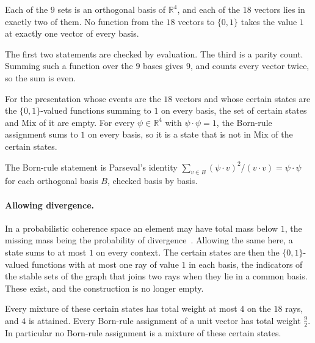 \begin{theorem}
\label{thm:ks}
Each of the $9$ sets is an orthogonal basis of $\mathbb{R}^4$, and each of
the $18$ vectors lies in exactly two of them. No function from the $18$
vectors to $\{0,1\}$ takes the value $1$ at exactly one vector of every
basis.
\end{theorem}

\noindent
The first two statements are checked by evaluation. The third is a
parity count. Summing such a function over the $9$ bases gives $9$, and
counts every vector twice, so the sum is even.

\begin{theorem}
\label{thm:quantum}
For the presentation whose events are the $18$ vectors and whose certain
states are the $\{0,1\}$-valued functions summing to $1$ on every basis,
the set of certain states and $\mathrm{Mix}$ of it are empty. For every
$\psi \in \mathbb{R}^4$ with $\psi \cdot \psi = 1$, the Born-rule
assignment sums to $1$ on every basis, so it is a state that is not in
$\mathrm{Mix}$ of the certain states.
\end{theorem}

\noindent
The Born-rule statement is Parseval's identity
$\sum_{v \in B} (\psi \cdot v)^2 / (v \cdot v) = \psi \cdot \psi$ for
each orthogonal basis $B$, checked basis by basis.

\paragraph{Allowing divergence.}
In a probabilistic coherence space an element may have total mass below
$1$, the missing mass being the probability of
divergence~\cite{danos-ehrhard2011}. Allowing the same here, a state sums to
at most $1$ on every context. The certain states are then the $\{0,1\}$-valued functions
with at most one ray of value $1$ in each basis, the indicators of the
stable sets of the graph that joins two rays when they lie in a common
basis. These exist, and the construction is no longer empty.

\begin{theorem}
\label{thm:quantum-partial}
Every mixture of these certain states has total weight at most $4$ on the
$18$ rays, and $4$ is attained. Every Born-rule assignment of a unit
vector has total weight $\tfrac92$. In particular no Born-rule assignment
is a mixture of these certain states.
\end{theorem}

